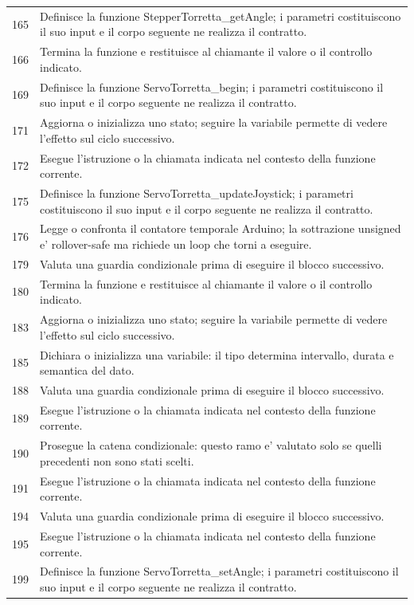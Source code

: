 \documentclass[11pt,a4paper]{article}
\begin{document}
\begin{longtable}{p{}p{}}
165 & Definisce la funzione StepperTorretta\_\allowbreak{}getAngle; i parametri costituiscono il suo input e il corpo seguente ne realizza il contratto. \\
166 & Termina la funzione e restituisce al chiamante il valore o il controllo indicato. \\
169 & Definisce la funzione ServoTorretta\_\allowbreak{}begin; i parametri costituiscono il suo input e il corpo seguente ne realizza il contratto. \\
171 & Aggiorna o inizializza uno stato; seguire la variabile permette di vedere l'effetto sul ciclo successivo. \\
172 & Esegue l'istruzione o la chiamata indicata nel contesto della funzione corrente. \\
175 & Definisce la funzione ServoTorretta\_\allowbreak{}updateJoystick; i parametri costituiscono il suo input e il corpo seguente ne realizza il contratto. \\
176 & Legge o confronta il contatore temporale Arduino; la sottrazione unsigned e' rollover-safe ma richiede un loop che torni a eseguire. \\
179 & Valuta una guardia condizionale prima di eseguire il blocco successivo. \\
180 & Termina la funzione e restituisce al chiamante il valore o il controllo indicato. \\
183 & Aggiorna o inizializza uno stato; seguire la variabile permette di vedere l'effetto sul ciclo successivo. \\
185 & Dichiara o inizializza una variabile: il tipo determina intervallo, durata e semantica del dato. \\
188 & Valuta una guardia condizionale prima di eseguire il blocco successivo. \\
189 & Esegue l'istruzione o la chiamata indicata nel contesto della funzione corrente. \\
190 & Prosegue la catena condizionale: questo ramo e' valutato solo se quelli precedenti non sono stati scelti. \\
191 & Esegue l'istruzione o la chiamata indicata nel contesto della funzione corrente. \\
194 & Valuta una guardia condizionale prima di eseguire il blocco successivo. \\
195 & Esegue l'istruzione o la chiamata indicata nel contesto della funzione corrente. \\
199 & Definisce la funzione ServoTorretta\_\allowbreak{}setAngle; i parametri costituiscono il suo input e il corpo seguente ne realizza il contratto. \\

\end{longtable}
\end{document}
